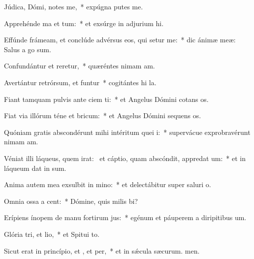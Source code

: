 \item Júdica, Dómi, notes me,~* expúgna putes me.
\item Apprehénde ma et tum:~* et exsúrge in adjurium hi.
\item Effúnde frámeam, et conclúde advérsus eos, qui setur me:~* dic ánimæ meæ: Salus a go sum.
\item Confundántur et reretur,~* quæréntes nimam am.
\item Avertántur retrórsum, et funtur~* cogitántes hi la.
\item Fiant tamquam pulvis ante ciem ti:~* et Angelus Dómini cotans os.
\item Fiat via illórum téne et bricum:~* et Angelus Dómini sequens os.
\item Quóniam gratis abscondérunt mihi intéritum quei i:~* supervácue exprobravérunt nimam am.
\item Véniat illi láqueus, quem irat:~\pscross{} et cáptio, quam abscóndit, appredat um:~* et in láqueum dat in sum.
\item Anima autem mea exsulbit in mino:~* et delectábitur super saluri o.
\item Omnia ossa a cent:~* Dómine, quis milis bi?
\item Erípiens ínopem de manu fortirum jus:~* egénum et páuperem a diripitibus um.
\item Glória tri, et lio,~* et Spitui to.
\item Sicut erat in princípio, et , et per,~* et in sǽcula sæcurum. men.
